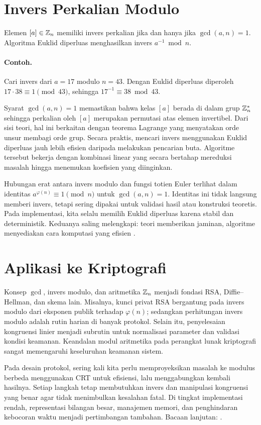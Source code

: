 \documentclass[../main.tex]{subfiles}
\begin{document}
\section{Invers Perkalian Modulo}
Elemen \([a]\in\mathbb{Z}_n\) memiliki invers perkalian jika dan hanya jika \(\gcd(a,n)=1\). Algoritma Euklid diperluas menghasilkan invers \(a^{-1} \bmod n\).

\paragraph{Contoh.} Cari invers dari \(a=17\) modulo \(n=43\). Dengan Euklid diperluas diperoleh \(17\cdot 38 \equiv 1 \pmod{43}\), sehingga \(17^{-1}\equiv 38\bmod 43\).

Syarat \(\gcd(a,n)=1\) memastikan bahwa kelas \([a]\) berada di dalam grup \(\mathbb{Z}_n^*\) sehingga perkalian oleh \([a]\) merupakan permutasi atas elemen invertibel. Dari sisi teori, hal ini berkaitan dengan teorema Lagrange yang menyatakan orde unsur membagi orde grup. Secara praktis, mencari invers menggunakan Euklid diperluas jauh lebih efisien daripada melakukan pencarian buta. Algoritme tersebut bekerja dengan kombinasi linear yang secara bertahap mereduksi masalah hingga menemukan koefisien yang diinginkan.

Hubungan erat antara invers modulo dan fungsi totien Euler terlihat dalam identitas \(a^{\varphi(n)}\equiv 1\pmod n\) untuk \(\gcd(a,n)=1\). Identitas ini tidak langsung memberi invers, tetapi sering dipakai untuk validasi hasil atau konstruksi teoretis. Pada implementasi, kita selalu memilih Euklid diperluas karena stabil dan deterministik. Keduanya saling melengkapi: teori memberikan jaminan, algoritme menyediakan cara komputasi yang efisien \citep{hoffstein,rosen}.

\section{Aplikasi ke Kriptografi}
Konsep \(\gcd\), invers modulo, dan aritmetika \(\mathbb{Z}_n\) menjadi fondasi RSA, Diffie--Hellman, dan skema lain. Misalnya, kunci privat RSA bergantung pada invers modulo dari eksponen publik terhadap \(\varphi(n)\); sedangkan perhitungan invers modulo adalah rutin harian di banyak protokol. Selain itu, penyelesaian kongruensi linier menjadi subrutin untuk normalisasi parameter dan validasi kondisi keamanan. Keandalan modul aritmetika pada perangkat lunak kriptografi sangat memengaruhi keseluruhan keamanan sistem.

Pada desain protokol, sering kali kita perlu memproyeksikan masalah ke modulus berbeda menggunakan CRT untuk efisiensi, lalu menggabungkan kembali hasilnya. Setiap langkah tetap membutuhkan invers dan manipulasi kongruensi yang benar agar tidak menimbulkan kesalahan fatal. Di tingkat implementasi rendah, representasi bilangan besar, manajemen memori, dan penghindaran kebocoran waktu menjadi pertimbangan tambahan. Bacaan lanjutan: \citep{hoffstein,hardywright,nivenzuckermanmontgomery}.
\end{document}
